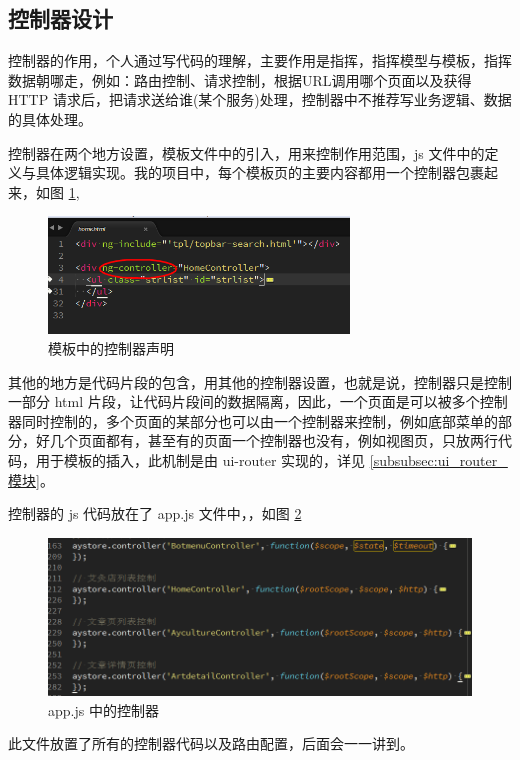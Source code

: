 \documentclass[UTF8]{ctexbook}
\begin{document}
    \subsection{控制器设计}
      \label{subsec:控制器设计}
        控制器的作用，个人通过写代码的理解，主要作用是指挥，指挥模型与模板，指挥数据朝哪走，例如：路由控制、请求控制，根据URL调用哪个页面以及获得 HTTP 请求后，把请求送给谁(某个服务)处理，控制器中不推荐写业务逻辑、数据的具体处理。
        \par
        控制器在两个地方设置，模板文件中的引入，用来控制作用范围，js 文件中的定义与具体逻辑实现。我的项目中，每个模板页的主要内容都用一个控制器包裹起来，如图 \ref{fig:ctrl},
        \begin{figure}[H]
          \centering
          \includegraphics[width=8cm]{./img/ctrl.png}
          \caption{模板中的控制器声明 }
          \label{fig:ctrl}
        \end{figure}
        其他的地方是代码片段的包含，用其他的控制器设置，也就是说，控制器只是控制一部分 html 片段，让代码片段间的数据隔离，因此，一个页面是可以被多个控制器同时控制的，多个页面的某部分也可以由一个控制器来控制，例如底部菜单的部分，好几个页面都有，甚至有的页面一个控制器也没有，例如视图页，只放两行代码，用于模板的插入，此机制是由 ui-router 实现的，详见 \ref{subsubsec:ui_router_模块}。
        \par
        控制器的 js 代码放在了 app.js 文件中，，如图 \ref{fig:ctrl_js}
        \begin{figure}[H]
          \centering
          \includegraphics[width=12cm]{./img/ctrl_js.png}
          \caption{app.js 中的控制器}
          \label{fig:ctrl_js}
        \end{figure}
        此文件放置了所有的控制器代码以及路由配置，后面会一一讲到。
\end{document}
